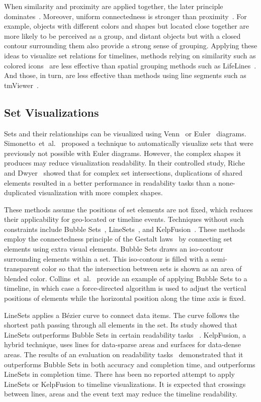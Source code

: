 When similarity and proximity are applied together, the later principle dominates~\cite{Ware2013}. Moreover, uniform connectedness is stronger than proximity~\cite{Palmer1994}. For example, objects with different colors and shapes but located close together are more likely to be perceived as a group, and distant objects but with a closed contour surrounding them also provide a strong sense of grouping. Applying these ideas to visualize set relations for timelines, methods relying on similarity such as colored icons~\cite{Wang2008} are less effective than spatial grouping methods such as LifeLines~\cite{Plaisant1996}. And those, in turn, are less effective than methods using line segments such as tmViewer~\cite{Kumar1998}. 

\subsection{Set Visualizations}
Sets and their relationships can be visualized using Venn~\cite{Ruskey1997} or Euler~\cite{Rodgers2014} diagrams. Simonetto~et~al.~\cite{Simonetto2009} proposed a technique to automatically visualize sets that were previously not possible with Euler diagrams. However, the complex shapes it produces may reduce visualization readability. In their controlled study, Riche and Dwyer~\cite{Riche2010} showed that for complex set intersections, duplications of shared elements resulted in a better performance in readability tasks than a none-duplicated visualization with more complex shapes. 

These methods assume the positions of set elements are not fixed, which reduces their applicability for geo-located or timeline events. Techniques without such constraints include Bubble Sets~\cite{Collins2009a}, LineSets~\cite{Alper2011}, and KelpFusion~\cite{Meulemans2013}. These methods employ the connectedness principle of the Gestalt laws~\cite{Palmer1994} by connecting set elements using extra visual elements. Bubble Sets draws an iso-contour surrounding elements within a set. This iso-contour is filled with a semi-transparent color so that the intersection between sets is shown as an area of blended color. Collins~et~al.~\cite{Collins2009a} provide an example of applying Bubble Sets to a timeline, in which case a force-directed algorithm is used to adjust the vertical positions of elements while the horizontal position along the time axis is fixed. 

LineSets applies a B\'{e}zier curve to connect data items. The curve follows the shortest path passing through all elements in the set. Its study showed that LineSets outperforms Bubble Sets in certain readability tasks ~\cite{Alper2011}. KelpFusion, a hybrid technique, uses lines for data-sparse areas and surfaces for data-dense areas. The results of an evaluation on readability tasks~\cite{Meulemans2013} demonstrated that it outperforms Bubble Sets in both accuracy and completion time, and outperforms LineSets in completion time. There has been no reported attempt to apply LineSets or KelpFusion to timeline visualizations. It is expected that crossings between lines, areas and the event text may reduce the timeline readability.